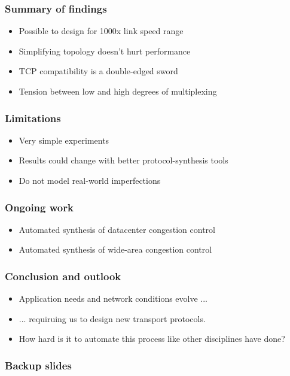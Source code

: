 \documentclass[svgnames]{beamer}
\begin{document}
\begin{Large}
\begin{frame}
\frametitle{Summary of findings}
\begin{itemize}
\item<1-> Possible to design for 1000x link speed range
\item<2-> Simplifying topology doesn't hurt performance
\item<3-> TCP compatibility is a double-edged sword 
\item<4-> Tension between low and high degrees of multiplexing
\end{itemize}
\end{frame}

\begin{frame}
\frametitle{Limitations}
\begin{itemize}
\item<1-> Very simple experiments
\item<2-> Results could change with better protocol-synthesis tools
\item<3-> Do not model real-world imperfections
\end{itemize}
\end{frame}
\begin{frame}

\frametitle{Ongoing work}
\begin{itemize}
\item<1-> Automated synthesis of datacenter congestion control
\item<2-> Automated synthesis of wide-area congestion control
\end{itemize}
\end{frame}

\begin{frame}
\frametitle{Conclusion and outlook}
\begin{itemize}
\item<1-> Application needs and network conditions evolve ...
\item<2-> ... requiruing us to design new transport protocols.
\item<3-> How hard is it to automate this process like other disciplines have done?
\end{itemize}
\end{frame}

\end{Large}

\begin{frame}
\frametitle{Backup slides}
\end{frame}







\end{document}
